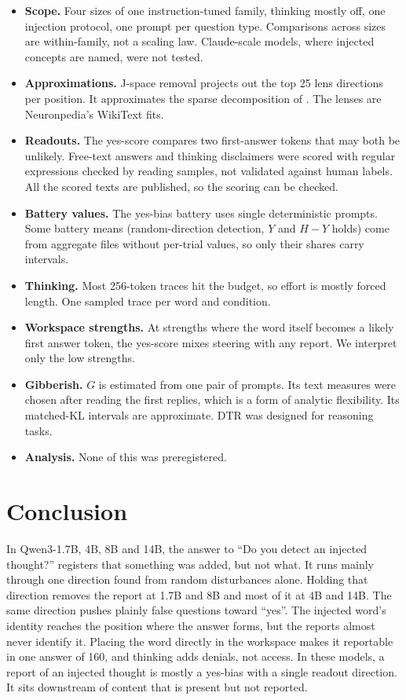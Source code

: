 \documentclass[11pt]{article}
\newcommand{\ys}{yes-score}
\begin{document}
\begin{itemize}
  \item \textbf{Scope.} Four sizes of one instruction-tuned family, thinking mostly off, one injection protocol, one prompt per question type. Comparisons across sizes are within-family, not a scaling law. Claude-scale models, where injected concepts are named, were not tested.
  \item \textbf{Approximations.} J-space removal projects out the top 25 lens directions per position. It approximates the sparse decomposition of \citet{gurnee2026workspace}. The lenses are Neuronpedia's WikiText fits.
  \item \textbf{Readouts.} The \ys{} compares two first-answer tokens that may both be unlikely. Free-text answers and thinking disclaimers were scored with regular expressions checked by reading samples, not validated against human labels. All the scored texts are published, so the scoring can be checked.
  \item \textbf{Battery values.} The yes-bias battery uses single deterministic prompts. Some battery means (random-direction detection, $Y$ and $H-Y$ holds) come from aggregate files without per-trial values, so only their shares carry intervals.
  \item \textbf{Thinking.} Most 256-token traces hit the budget, so effort is mostly forced length. One sampled trace per word and condition.
  \item \textbf{Workspace strengths.} At strengths where the word itself becomes a likely first answer token, the \ys{} mixes steering with any report. We interpret only the low strengths.
  \item \textbf{Gibberish.} $G$ is estimated from one pair of prompts. Its text measures were chosen after reading the first replies, which is a form of analytic flexibility. Its matched-KL intervals are approximate. DTR was designed for reasoning tasks.
  \item \textbf{Analysis.} None of this was preregistered.
\end{itemize}

\section{Conclusion}

In Qwen3-1.7B, 4B, 8B and 14B, the answer to ``Do you detect an injected thought?'' registers that something was added, but not what. It runs mainly through one direction found from random disturbances alone. Holding that direction removes the report at 1.7B and 8B and most of it at 4B and 14B. The same direction pushes plainly false questions toward ``yes''. The injected word's identity reaches the position where the answer forms, but the reports almost never identify it. Placing the word directly in the workspace makes it reportable in one answer of 160, and thinking adds denials, not access. In these models, a report of an injected thought is mostly a yes-bias with a single readout direction. It sits downstream of content that is present but not reported.
\end{document}
